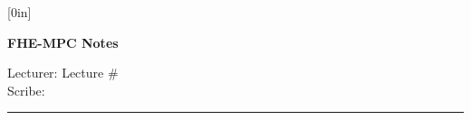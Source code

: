 \documentclass[11pt]{article}
\begin{document}
\thispagestyle{empty}

\raisebox{0.6in}[0in]{}
\vspace{-0.7in}

\begin{center}
\bf\large FHE-MPC Notes
\end{center}

\noindent
Lecturer:                %
\hfill
Lecture \#               %
\\
Scribe:                  %
\hfill

\noindent
\rule{\textwidth}{1pt}

\medskip








\end{document}
